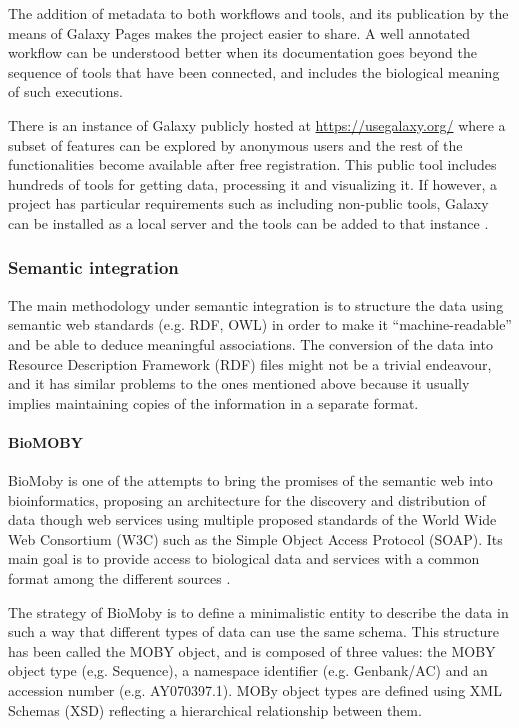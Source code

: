 The addition of metadata to both workflows and tools, and its publication by the means of Galaxy Pages makes the project easier to share. A well annotated workflow can be understood better when its documentation goes beyond the sequence of tools that have been connected, and includes the biological meaning of such executions.

There is an instance of Galaxy publicly hosted at \url{https://usegalaxy.org/} where a subset of features can be explored by anonymous users and the rest of the functionalities become available after free registration. This public tool includes hundreds of tools for getting data, processing it and visualizing it. If however, a project has particular requirements such as including non-public tools, Galaxy can be installed as a local server and the tools can be added to that instance \cite{GIA2005, GOE2010}.


\subsubsection{Semantic integration} 
The main methodology under semantic integration is to structure the data using semantic web standards (e.g. RDF, OWL) in order to make it ``machine-readable'' and be able to deduce meaningful associations. The conversion of the data into Resource Description Framework (RDF) files might not be a trivial endeavour, and it has similar problems to the ones mentioned above because it usually implies maintaining copies of the information in a separate format. 

\paragraph{BioMOBY}
BioMoby is one of the attempts to bring the promises of the semantic web into bioinformatics, proposing an architecture for the discovery and distribution of data though web services using multiple proposed standards of the World Wide Web Consortium (W3C) such as the Simple Object Access Protocol (SOAP). Its main goal is to provide access to biological data and services with a common format among the different sources \cite{WIL2002}.

The strategy of BioMoby is to define a minimalistic entity to describe the data in such a way that different types of data can use the same schema.
This structure has been called the MOBY object, and is composed of three values: the MOBY object type (e,g. Sequence), a namespace identifier (e.g. Genbank/AC) and an accession number (e.g. AY070397.1). MOBy object types are defined using XML Schemas (XSD) reflecting a hierarchical relationship between them.

